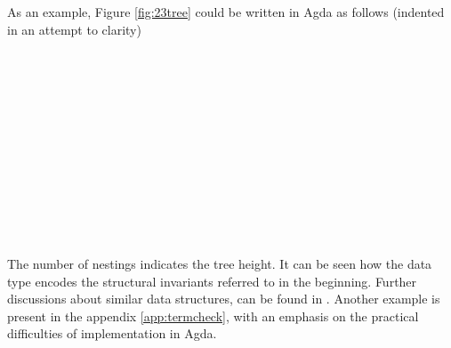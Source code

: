 \documentclass[12pt,twoside,notitlepage]{report}
\begin{document}
\begin{code}
\\
\>  \AgdaSymbol{(} \AgdaSymbol{:} \AgdaSymbol{)} \AgdaSymbol{:}  \<%
\\
\>[0]\<[2]%
\>[2] \AgdaSymbol{:}    \<%
\\
\>[0]\<[2]%
\>[2] \AgdaSymbol{:}  \AgdaSymbol{(} \AgdaSymbol{)}   \<%
\\
\end{code}

As an example, Figure \ref{fig:23tree} could be written in Agda as follows (indented in an attempt to clarity)

\begin{code}
\\
\> \AgdaSymbol{:}  \<%
\\
\> \AgdaSymbol{=} \AgdaSymbol{(}\AgdaSymbol{(}\AgdaSymbol{(}\<%
\\
\>[2]\<[14]%
\>[14]\AgdaSymbol{(}\<%
\\
\>[14]\<[18]%
\>[18]\AgdaSymbol{(}\<%
\\
\>[18]\<[20]%
\>[20]\AgdaSymbol{(}   \AgdaSymbol{)}\<%
\\
\>[18]\<[20]%
\>[20]\AgdaSymbol{(}  \AgdaSymbol{)}\<%
\\
\>[18]\<[20]%
\>[20]\AgdaSymbol{(}  \AgdaSymbol{))}\<%
\\
\>[0]\<[18]%
\>[18]\AgdaSymbol{(}\<%
\\
\>[18]\<[20]%
\>[20]\AgdaSymbol{(}   \AgdaSymbol{)}\<%
\\
\>[18]\<[20]%
\>[20]\AgdaSymbol{(}  \AgdaSymbol{))))))}\<%
\\
\end{code}
The number of  nestings indicates the tree height. It can be seen how the data type encodes the structural invariants referred to in the beginning. Further discussions about similar data structures, can be found in \cite{nestedhinze}. Another example is present in the appendix \ref{app:termcheck}, with an emphasis on the practical difficulties of implementation in Agda.
\end{document}
